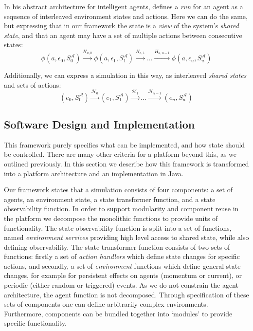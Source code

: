 In his abstract architecture for intelligent agents, \citet{Wooldridge2002}
defines a \emph{run} for an agent as a sequence of interleaved environment
states and actions. Here we can do the same, but expressing that in our
framework the state is a \emph{view} of the system's \emph{shared state}, and
that an agent may have a set of multiple actions between consecutive states:
\begin{equation*}
\phi(a, \epsilon_{0}, S_{0}^{\mathcal{A}}) \xrightarrow{H_{a,0}} \phi(a, \epsilon_{1}, S_{1}^{\mathcal{A}}) \xrightarrow{H_{a,1}}  \ldots \xrightarrow{H_{a,u-1}} \phi(a, \epsilon_{u}, S_{u}^{\mathcal{A}})
\end{equation*}

Additionally, we can express a simulation in this way, as interleaved \emph{
shared states} and sets of actions:
\begin{equation*}
(e_0, S_{0}^{\mathcal{A}}) \xrightarrow{\mathcal{H}_{0}} (e_1, S_{1}^{\mathcal{A}}) \xrightarrow{\mathcal{H}_{1}} \ldots \xrightarrow{\mathcal{H}_{u-1}} (e_u, S_{u}^{\mathcal{A}})
\end{equation*}


\subsection{Software Design and Implementation}

This framework purely specifies what can be implemented, and how state should
be controlled. There are many other criteria for a platform beyond this, as we
outlined previously. In this section we describe how this framework is
transformed into a platform architecture and an implementation in Java.

Our framework states that a simulation consists of four components: a set of
agents, an environment state, a state transformer function, and a state
observability function.  In order to support modularity and component reuse in
the platform we decompose the monolithic functions to provide units of
functionality. The state observability function is split into a set of
functions, named \emph{environment services} providing high level access to
shared state, while also defining observability. The state transformer
function consists of two sets of functions: firstly a set of \emph{action
handlers} which define state changes for specific actions, and secondly, a set
of \emph{environment} functions which define general state changes, for
example for persistent effects on agents (momentum or current), or periodic
(either random or triggered) events.  As we do not constrain the agent
architecture, the agent function is not decomposed. Through specification of
these sets of components one can define arbitrarily complex environments.
Furthermore, components can be bundled together into `modules' to provide
specific functionality.

